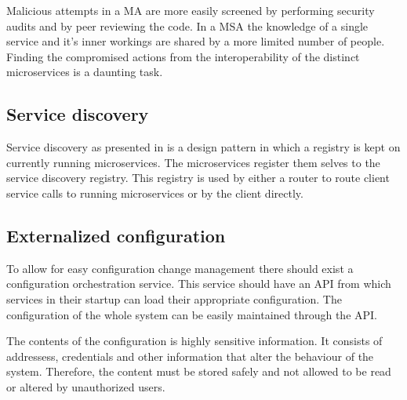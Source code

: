 \begin{sloppypar}
    Malicious attempts in a MA are more easily screened by performing security
    audits and by peer reviewing the code. In a MSA the knowledge of a single 
    service and it's inner workings are shared by a more limited number of people.
    Finding the compromised actions from the interoperability of the distinct 
    microservices is a daunting task.
\end{sloppypar}

\subsection{Service discovery}
\begin{sloppypar}
    Service discovery as presented in \citet{DBLP:journals/corr/MontesiW16} is a 
    design pattern in which a registry is kept on currently running microservices. 
    The microservices register them selves to the service discovery registry. 
    This registry is used by either a router to route client service calls to 
    running microservices or by the client directly.
\end{sloppypar}


\subsection{Externalized configuration}
\begin{sloppypar}
    To allow for easy configuration change management there should exist a 
    configuration orchestration service. This service should have an API from 
    which services in their startup can load their appropriate configuration. 
    The configuration of the whole system can be easily maintained through the 
    API.
\end{sloppypar}
\begin{sloppypar}
    The contents of the configuration is highly sensitive information. It 
    consists of addressess, credentials and other information that alter 
    the behaviour of the system. Therefore, the content must be stored safely 
    and not allowed to be read or altered by unauthorized users.
\end{sloppypar}

